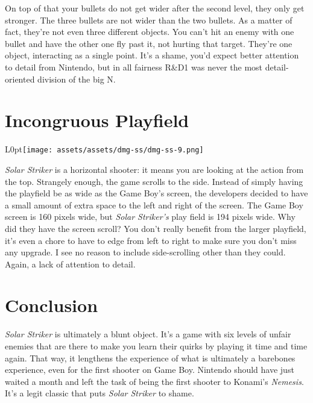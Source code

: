 \documentclass{book}
\begin{document}
\begin{minipage}{0.45\linewidth}\end{minipage}
\par\justifying
On top of that your bullets do not get wider after the second level, they only get stronger. The three bullets are not wider than the two bullets. As a matter of fact, they’re not even three different objects. You can’t hit an enemy with one bullet and have the other one fly past it, not hurting that target. They’re one object, interacting as a single point. It’s a shame, you’d expect better attention to detail from Nintendo, but in all fairness R\&D1 was never the most detail-oriented division of the big N.\par
\FloatBarrier\section*{Incongruous Playfield}
\begin{wrapfigure}{L}{0pt}{\texttt{[image: assets/assets/dmg-ss/dmg-ss-9.png]}}\end{wrapfigure}\noindent
\emph{Solar Striker} is a horizontal shooter: it means you are looking at the action from the top. Strangely enough, the game scrolls to the side. Instead of simply having the playfield be as wide as the Game Boy’s screen, the developers decided to have a small amount of extra space to the left and right of the screen. The Game Boy screen is 160 pixels wide, but \emph{Solar Striker’s} play field is 194 pixels wide. Why did they have the screen scroll? You don’t really benefit from the larger playfield, it’s even a chore to have to edge from left to right to make sure you don’t miss any upgrade. I see no reason to include side-scrolling other than they could. Again, a lack of attention to detail.\par
\FloatBarrier\section*{Conclusion}
\emph{Solar Striker} is ultimately a blunt object. It’s a game with six levels of unfair enemies that are there to make you learn their quirks by playing it time and time again. That way, it lengthens the experience of what is ultimately a barebones experience, even for the first shooter on Game Boy. Nintendo should have just waited a month and left the task of being the first shooter to Konami’s \emph{Nemesis}. It’s a legit classic that puts \emph{Solar Striker} to shame.\par
\end{document}
